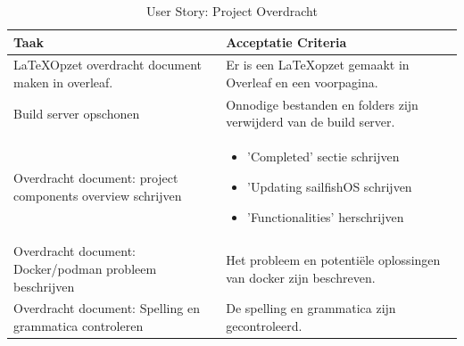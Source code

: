 \documentclass[a4paper]{report}
\newcommand{\userstorycolor}{PeachPuff1}
\begin{document}
\begin{tcolorbox}[colback=white, coltitle=black, colframe=\userstorycolor, title=\textbf{User Story: }Als opdrachtgever wil ik dat het project gemakkelijk overgedragen kan worden\, zodat een volgend team snel aan de slag kan.]
  \begin{table}[H]
      \centering
    \begin{tabularx}{1\textwidth}{|X|X|}
      \hline
      \cellcolor[HTML]{ffcc99} \textbf{Taak} & \cellcolor[HTML]{ffcc99} \textbf{Acceptatie Criteria} \\ 
      \hline
      \LaTeX \space Opzet overdracht document maken in overleaf. & Er is een \LaTeX \space opzet gemaakt in Overleaf en een voorpagina. \\
      \hline 
      Build server opschonen & Onnodige bestanden en folders zijn verwijderd van de build server. \\ 
      \hline 
      Overdracht document: project components overview schrijven & \begin{itemize} 
      \item 'Completed' sectie schrijven 
      \item 'Updating sailfishOS schrijven  
      \item 'Functionalities' herschrijven 
      \end{itemize}  \\
      \hline
      Overdracht document: Docker/podman probleem beschrijven & Het probleem en potentiële oplossingen van docker zijn beschreven. \\ 
      \hline
      Overdracht document: Spelling en grammatica controleren & De spelling en grammatica zijn gecontroleerd. \\
      \hline

    \end{tabularx}
    \caption{User Story: Project Overdracht}
  \label{table:it8:story_transfer}
  \end{table}
  \end{tcolorbox}
\end{document}
